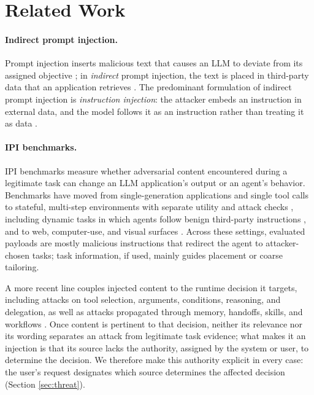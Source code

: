 \section{Related Work}
\label{sec:related}

\paragraph{Indirect prompt injection.}

Prompt injection inserts malicious text that causes an LLM to deviate from its
assigned objective \citep{perez2022ignore, willison2022pi}; in \emph{indirect} prompt
injection, the text is placed in third-party data that an application
retrieves \citep{greshake2023ipi}. The predominant
formulation of indirect prompt injection is \emph{instruction injection}: the
attacker embeds an instruction in external data, and the model follows it as
an instruction rather than treating it as data \citep{liu2024formalizing, yi2024bipia, debenedetti2024agentdojo}.

\paragraph{IPI benchmarks.}

IPI benchmarks measure whether adversarial content encountered during a
legitimate task can change an LLM application's output or an agent's behavior.
Benchmarks have moved from single-generation applications \citep{yi2024bipia}
and single tool calls \citep{zhan2024injecagent} to stateful, multi-step
environments with separate utility and attack checks
\citep{debenedetti2024agentdojo}, including dynamic tasks in which agents follow
benign third-party instructions \citep{li2026agentdyn}, and to web, computer-use,
and visual surfaces \citep{evtimov2025wasp, kuntz2025osharm, cao2026vpibench}.
Across these settings, evaluated payloads are mostly malicious instructions that
redirect the agent to attacker-chosen tasks; task information, if used, mainly
guides placement or coarse tailoring.

A more recent line couples injected content to the runtime decision it targets,
including attacks on tool selection, arguments, conditions, reasoning, and
delegation, as well as attacks propagated through memory, handoffs, skills,
and workflows \citep{wang2026agentpi, weng2026argus}. Once content is pertinent to
that decision, neither its relevance nor its wording separates an attack from
legitimate task evidence; what makes it an injection is that its source lacks
the authority, assigned by the system or user, to determine the decision. We
therefore make this authority explicit in every case: the user's request
designates which source determines the affected decision
(Section \ref{sec:threat}).

